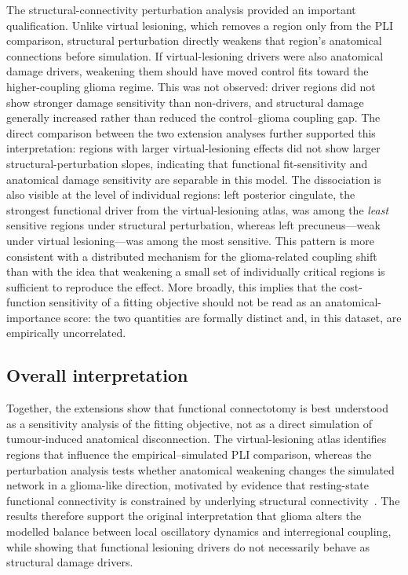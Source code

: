 \documentclass[11pt, reprint, aps, prl, floatfix, secnumarabic]{revtex4-2}
\begin{document}
The structural-connectivity perturbation analysis provided an important qualification. Unlike virtual lesioning, which removes a region only from the PLI comparison, structural perturbation directly weakens that region's anatomical connections before simulation. If virtual-lesioning drivers were also anatomical damage drivers, weakening them should have moved control fits toward the higher-coupling glioma regime. This was not observed: driver regions did not show stronger damage sensitivity than non-drivers, and structural damage generally increased rather than reduced the control--glioma coupling gap. The direct comparison between the two extension analyses further supported this interpretation: regions with larger virtual-lesioning effects did not show larger structural-perturbation slopes, indicating that functional fit-sensitivity and anatomical damage sensitivity are separable in this model. The dissociation is also visible at the level of individual regions: left posterior cingulate, the strongest functional driver from the virtual-lesioning atlas, was among the \emph{least} sensitive regions under structural perturbation, whereas left precuneus---weak under virtual lesioning---was among the most sensitive. This pattern is more consistent with a distributed mechanism for the glioma-related coupling shift than with the idea that weakening a small set of individually critical regions is sufficient to reproduce the effect. More broadly, this implies that the cost-function sensitivity of a fitting objective should not be read as an anatomical-importance score: the two quantities are formally distinct and, in this dataset, are empirically uncorrelated.

\subsection{Overall interpretation}

Together, the extensions show that functional connectotomy is best understood as a sensitivity analysis of the fitting objective, not as a direct simulation of tumour-induced anatomical disconnection. The virtual-lesioning atlas identifies regions that influence the empirical--simulated PLI comparison, whereas the perturbation analysis tests whether anatomical weakening changes the simulated network in a glioma-like direction, motivated by evidence that resting-state functional connectivity is constrained by underlying structural connectivity~\cite{Honey2009,Cabral2012}. The results therefore support the original interpretation that glioma alters the modelled balance between local oscillatory dynamics and interregional coupling, while showing that functional lesioning drivers do not necessarily behave as structural damage drivers.
\end{document}
